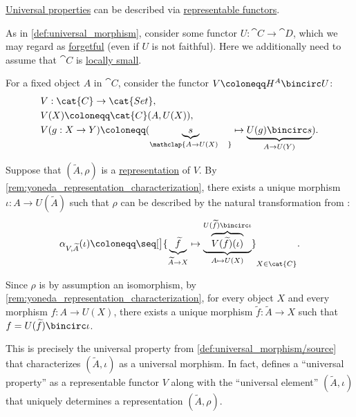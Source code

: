 \begin{remark}\label{rem:representable_functor_universal_morphism}
  \hyperref[con:universal_property]{Universal properties} can be described via \hyperref[def:functor_representation]{representable functors}.

  As in \cref{def:universal_morphism}, consider some functor \( U: \cat{C} \to \cat{D} \), which we may regard as \hyperref[con:forgetful_functor]{forgetful} (even if \( U \) is not faithful). Here we additionally need to assume that \( \cat{C} \) is \hyperref[def:small_category]{locally small}.

  For a fixed object \( A \) in \( \cat{C} \), consider the functor \( V \coloneqq H^A \bincirc U \):
  \begin{equation*}
    \begin{aligned}
      &V: \cat{C} \to \cat{Set}, \\
      &V(X) \coloneqq \cat{C}(A, U(X)), \\
      &V(g: X \to Y) \coloneqq (\underbrace{s}_{\mathclap{A \to U(X) \quad}} \mapsto \underbrace{U(g) \bincirc s}_{A \to U(Y)}). \\
    \end{aligned}
  \end{equation*}

  Suppose that \( (\widetilde{A}, \rho) \) is a \hyperref[def:functor_representation]{representation} of \( V \). By \cref{rem:yoneda_representation_characterization}, there exists a unique morphism \( \iota: A \to U(\widetilde{A}) \) such that \( \rho \) can be described by the natural transformation from :
  \begin{equation*}
    \alpha_{V,\widetilde{A}}(\iota) \coloneqq \seq[\big]{ \underbrace{\widetilde{f}}_{\widetilde{A} \to X} \mapsto \underbrace{\overbrace{V(\widetilde{f})(\iota)}^{U(\widetilde{f}) \bincirc \iota}}_{A \mapsto U(X)} }_{X \in \cat{C}}.
  \end{equation*}

  Since \( \rho \) is by assumption an isomorphism, by \cref{rem:yoneda_representation_characterization}, for every object \( X \) and every morphism \( f: A \to U(X) \), there exists a unique morphism \( \widetilde{f}: \widetilde{A} \to X \) such that \( f = U(\widetilde{f}) \bincirc \iota \).

  This is precisely the universal property from \cref{def:universal_morphism/source} that characterizes \( (\widetilde{A}, \iota) \) as a universal morphism. In fact, \textcite[62]{Riehl2016CategoryTheory} defines a \enquote{universal property} as a representable functor \( V \) along with the \enquote{universal element} \( (\widetilde{A}, \iota) \) that uniquely determines a representation \( (\widetilde{A}, \rho) \).
\end{remark}

